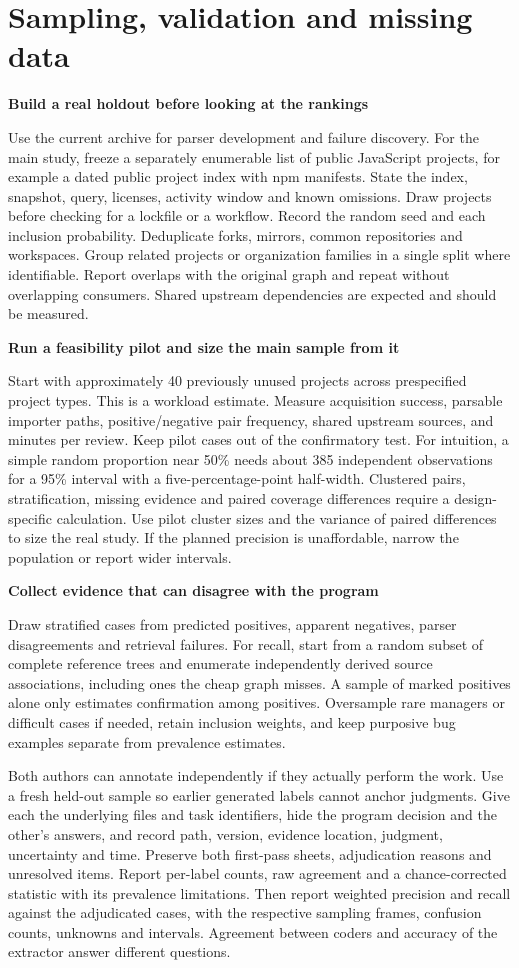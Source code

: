 \documentclass[11pt,a4paper]{article}
\newcommand{\pg}[1]{\newpage\section{\color{ink}#1}}
\newcommand{\hd}[1]{\par\textbf{\color{accent}#1}\par\nopagebreak}
\begin{document}
\pg{Sampling, validation and missing data}
\hd{Build a real holdout before looking at the rankings}
Use the current archive for parser development and failure discovery. For the main study, freeze a separately enumerable list of public JavaScript projects, for example a dated public project index with npm manifests. State the index, snapshot, query, licenses, activity window and known omissions. Draw projects before checking for a lockfile or a workflow. Record the random seed and each inclusion probability. Deduplicate forks, mirrors, common repositories and workspaces. Group related projects or organization families in a single split where identifiable. Report overlaps with the original graph and repeat without overlapping consumers. Shared upstream dependencies are expected and should be measured.

\hd{Run a feasibility pilot and size the main sample from it}
Start with approximately 40 previously unused projects across prespecified project types. This is a workload estimate. Measure acquisition success, parsable importer paths, positive/negative pair frequency, shared upstream sources, and minutes per review. Keep pilot cases out of the confirmatory test. For intuition, a simple random proportion near 50\% needs about 385 independent observations for a 95\% interval with a five-percentage-point half-width. Clustered pairs, stratification, missing evidence and paired coverage differences require a design-specific calculation. Use pilot cluster sizes and the variance of paired differences to size the real study. If the planned precision is unaffordable, narrow the population or report wider intervals.

\hd{Collect evidence that can disagree with the program}
Draw stratified cases from predicted positives, apparent negatives, parser disagreements and retrieval failures. For recall, start from a random subset of complete reference trees and enumerate independently derived source associations, including ones the cheap graph misses. A sample of marked positives alone only estimates confirmation among positives. Oversample rare managers or difficult cases if needed, retain inclusion weights, and keep purposive bug examples separate from prevalence estimates.

Both authors can annotate independently if they actually perform the work. Use a fresh held-out sample so earlier generated labels cannot anchor judgments. Give each the underlying files and task identifiers, hide the program decision and the other's answers, and record path, version, evidence location, judgment, uncertainty and time. Preserve both first-pass sheets, adjudication reasons and unresolved items. Report per-label counts, raw agreement and a chance-corrected statistic with its prevalence limitations. Then report weighted precision and recall against the adjudicated cases, with the respective sampling frames, confusion counts, unknowns and intervals. Agreement between coders and accuracy of the extractor answer different questions.
\end{document}
